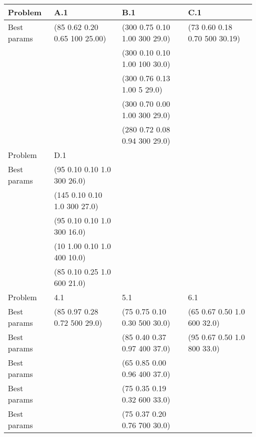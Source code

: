 \begin{tabular}{*{4}{C{60pt}}}
	\toprule
	Problem     & A.1                           & B.1                           & C.1 \\
	\midrule
	Best params & (85 0.62 0.20 0.65 100 25.00) & (300 0.75 0.10 1.00 300 29.0) & (73 0.60 0.18 0.70 500 30.19) \\
	            &                               & (300 0.10 0.10 1.00 100 30.0) & \\
	            &                               & (300 0.76 0.13 1.00 5   29.0) & \\
	            &                               & (300 0.70 0.00 1.00 300 29.0) & \\
	            &                               & (280 0.72 0.08 0.94 300 29.0) & \\
	\midrule
	\midrule
	Problem     & D.1 & & \\
	\midrule
	Best params & (95  0.10 0.10 1.0 300 26.0) & & \\
	            & (145 0.10 0.10 1.0 300 27.0) & & \\
	            & (95  0.10 0.10 1.0 300 16.0) & & \\
	            & (10  1.00 0.10 1.0 400 10.0) & & \\
	            & (85  0.10 0.25 1.0 600 21.0) & & \\
	\midrule
	\midrule
	Problem     & 4.1                          & 5.1                          & 6.1 \\
	\midrule
	Best params & (85 0.97 0.28 0.72 500 29.0) & (75 0.75 0.10 0.30 500 30.0) & (65 0.67 0.50 1.0 600 32.0) \\
	Best params &                              & (85 0.40 0.37 0.97 400 37.0) & (95 0.67 0.50 1.0 800 33.0) \\
	Best params &                              & (65 0.85 0.00 0.96 400 37.0) & \\
	Best params &                              & (75 0.35 0.19 0.32 600 33.0) & \\
	Best params &                              & (75 0.37 0.20 0.76 700 30.0) & \\
	\bottomrule
\end{tabular}

